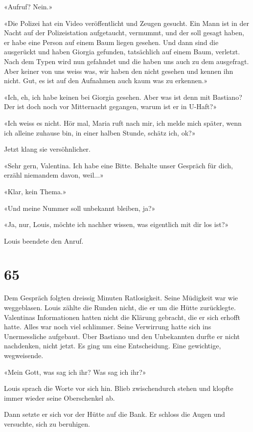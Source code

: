 «Aufruf? Nein.»

«Die Polizei hat ein Video veröffentlicht und Zeugen gesucht. Ein Mann
ist in der Nacht auf der Polizeistation aufgetaucht, vermummt, und der
soll gesagt haben, er habe eine Person auf einem Baum liegen gesehen.
Und dann sind die ausgerückt und haben Giorgia gefunden, tatsächlich auf
einem Baum, verletzt. Nach dem Typen wird nun gefahndet und die haben
uns auch zu dem ausgefragt. Aber keiner von uns weiss was, wir haben den
nicht gesehen und kennen ihn nicht. Gut, es ist auf den Aufnahmen auch
kaum was zu erkennen.»

«Ich, eh, ich habe keinen bei Giorgia gesehen. Aber was ist denn mit
Bastiano? Der ist doch noch vor Mitternacht gegangen, warum ist er in
U-Haft?»

«Ich weiss es nicht. Hör mal, Maria ruft nach mir, ich melde mich
später, wenn ich alleine zuhause bin, in einer halben Stunde, schätz
ich, ok?»

Jetzt klang sie versöhnlicher.

«Sehr gern, Valentina. Ich habe eine Bitte. Behalte unser Gespräch für
dich, erzähl niemandem davon, weil...»

«Klar, kein Thema.»

«Und meine Nummer soll unbekannt bleiben, ja?»

«Ja, nur, Louis, möchte ich nachher wissen, was eigentlich mit dir los
ist?»

Louis beendete den Anruf.

\chapter{65}\label{section-65}

Dem Gespräch folgten dreissig Minuten Ratlosigkeit. Seine Müdigkeit war
wie weggeblasen. Louis zählte die Runden nicht, die er um die Hütte
zurücklegte. Valentinas Informationen hatten nicht die Klärung gebracht,
die er sich erhofft hatte. Alles war noch viel schlimmer. Seine
Verwirrung hatte sich ins Unermessliche aufgebaut. Über Bastiano und den
Unbekannten durfte er nicht nachdenken, nicht jetzt. Es ging um eine
Entscheidung. Eine gewichtige, wegweisende.

«Mein Gott, was sag ich ihr? Was sag ich ihr?»

Louis sprach die Worte vor sich hin. Blieb zwischendurch stehen und
klopfte immer wieder seine Oberschenkel ab.

Dann setzte er sich vor der Hütte auf die Bank. Er schloss die Augen und
versuchte, sich zu beruhigen.

